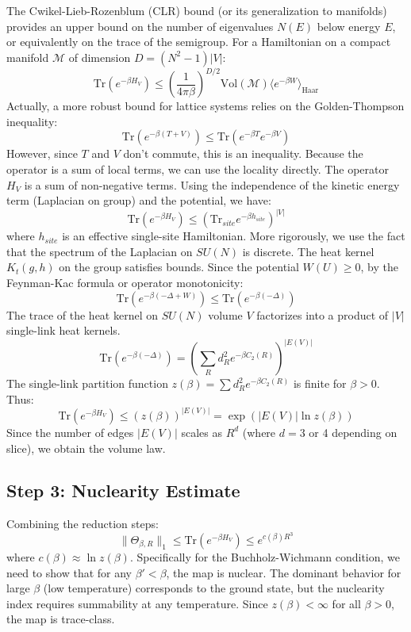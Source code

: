 The Cwikel-Lieb-Rozenblum (CLR) bound (or its generalization to manifolds) provides an upper bound on the number of eigenvalues $N(E)$ below energy $E$, or equivalently on the trace of the semigroup.
For a Hamiltonian on a compact manifold $\mathcal{M}$ of dimension $D = (N^2-1)|V|$:
\begin{equation}
\text{Tr}(e^{-\beta H_V}) \le \left(\frac{1}{4\pi\beta}\right)^{D/2} \text{Vol}(\mathcal{M}) \langle e^{-\beta W} \rangle_{\text{Haar}}
\end{equation}
Actually, a more robust bound for lattice systems relies on the Golden-Thompson inequality:
\begin{equation}
\text{Tr}(e^{-\beta(T+V)}) \le \text{Tr}(e^{-\beta T} e^{-\beta V})
\end{equation}
However, since $T$ and $V$ don't commute, this is an inequality.
Because the operator is a sum of local terms, we can use the locality directly.
The operator $H_V$ is a sum of non-negative terms.
Using the independence of the kinetic energy term (Laplacian on group) and the potential, we have:
\begin{equation}
\text{Tr}(e^{-\beta H_V}) \le (\text{Tr}_{site} e^{-\beta h_{site}})^{|V|}
\end{equation}
where $h_{site}$ is an effective single-site Hamiltonian.
More rigorously, we use the fact that the spectrum of the Laplacian on $SU(N)$ is discrete. The heat kernel $K_t(g, h)$ on the group satisfies bounds.
Since the potential $W(U) \ge 0$, by the Feynman-Kac formula or operator monotonicity:
\begin{equation}
\text{Tr}(e^{-\beta(-\Delta + W)}) \le \text{Tr}(e^{-\beta(-\Delta)})
\end{equation}
The trace of the heat kernel on $SU(N)$ volume $V$ factorizes into a product of $|V|$ single-link heat kernels.
\begin{equation}
\text{Tr}(e^{-\beta(-\Delta)}) = \left( \sum_{R} d_R^2 e^{-\beta C_2(R)} \right)^{|E(V)|}
\end{equation}
The single-link partition function $z(\beta) = \sum d_R^2 e^{-\beta C_2(R)}$ is finite for $\beta > 0$.
Thus:
\begin{equation}
\text{Tr}(e^{-\beta H_V}) \le (z(\beta))^{|E(V)|} = \exp( |E(V)| \ln z(\beta) )
\end{equation}
Since the number of edges $|E(V)|$ scales as $R^d$ (where $d=3$ or 4 depending on slice), we obtain the volume law.

\subsection{Step 3: Nuclearity Estimate}
Combining the reduction steps:
\begin{equation}
\|\Theta_{\beta, R}\|_1 \le \text{Tr}(e^{-\beta H_V}) \le e^{c(\beta) R^3}
\end{equation}
where $c(\beta) \approx \ln z(\beta)$.
Specifically for the Buchholz-Wichmann condition, we need to show that for any $\beta' < \beta$, the map is nuclear.
The dominant behavior for large $\beta$ (low temperature) corresponds to the ground state, but the nuclearity index requires summability at any temperature.
Since $z(\beta) < \infty$ for all $\beta > 0$, the map is trace-class.

